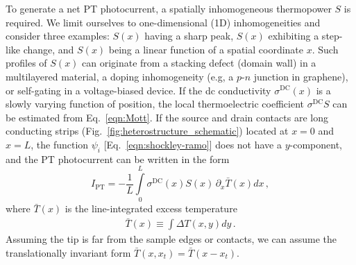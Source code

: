 \documentclass[aps, prb, reprint, superscriptaddress]{revtex4-2}
\begin{document}
To generate a net PT photocurrent,
a spatially inhomogeneous thermopower $S$ is required.
We limit ourselves to one-dimensional (1D) inhomogeneities and consider three examples: $S(x)$ having a sharp peak, $S(x)$ exhibiting a step-like change, and $S(x)$ being a linear function of a spatial coordinate $x$.
Such profiles of $S(x)$ can originate from a stacking defect (domain wall) in a multilayered material,
a doping inhomogeneity (e.g, a $p$-$n$ junction in graphene),
or self-gating in a voltage-biased device.
If the dc conductivity $\sigma^\mathrm{DC}(x)$ is a slowly varying function of position, the local thermoelectric coefficient $\sigma^\mathrm{DC} S$ can be estimated from Eq.~\eqref{eqn:Mott}. 
If the source and drain contacts are long conducting strips (Fig.~\ref{fig:heterostructure_schematic}) located at $x = 0$ and $x = L$, the function $\psi_i$ [Eq.~\eqref{eqn:shockley-ramo}] does not have a $y$-component, and
the PT photocurrent can be written in the form
\begin{equation}
	I_\mathrm{PT} 
	 = -\frac{1}{L} \int\limits_0^L \sigma^\mathrm{DC}(x) S(x)\, \partial_x \bar{T}(x) d x\,,
	\label{eqn:I_PC_2D}
\end{equation}
where $\bar{T}(x)$ is the line-integrated excess temperature
\begin{align}
	\bar{T}(x) \equiv \int\! \Delta T(x, y) d y\,.
	\label{eqn:PT_line}
\end{align}
Assuming the tip is far from the sample edges or contacts, we can assume the translationally invariant form $\bar{T}(x, x_t) = \bar{T}(x - x_t)$.
\end{document}
